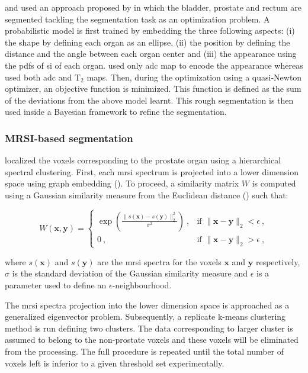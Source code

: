 \begin{enumerate}[leftmargin=*]
\cite{Litjens2011} and \cite{Vos2012} used an approach proposed by \cite{Huisman2010} in which the bladder, prostate and rectum are segmented tackling the segmentation task as an optimization problem. A probabilistic model is first trained by embedding the three following aspects: (i) the shape by defining each organ as an ellipse, (ii) the position by defining the distance and the angle between each organ center and (iii) the appearance using the \acp{pdf} of \ac{si} of each organ. \cite{Litjens2011} used only \ac{adc} map to encode the appearance whereas \cite{Vos2012} used both \ac{adc} and T$_2$ maps. Then, during the optimization using a quasi-Newton optimizer, an objective function is minimized. This function is defined as the sum of the deviations from the above model learnt. This rough segmentation is then used inside a Bayesian framework to refine the segmentation.

\end{enumerate}

\subsubsection{MRSI-based segmentation}

\cite{Tiwari2009} localized the voxels corresponding to the prostate organ using a hierarchical spectral clustering. First, each \ac{mrsi} spectrum is projected into a lower dimension space using graph embedding (\cite{Shi2000}). To proceed, a similarity matrix $W$ is computed using a Gaussian similarity measure from the Euclidean distance (\cite{Belkin2001}) such that:

\begin{equation}
	W(\mathbf{x},\mathbf{y}) =
	\begin{cases}	
	 	\exp \left( \frac{\| s(\mathbf{x}) - s(\mathbf{y}) \|_2^2}{\sigma^2} \right) \ , & \text{if } \| \mathbf{x} - \mathbf{y} \|_2 < \epsilon \ , \\
	 	0 \ , & \text{if } \| \mathbf{x} - \mathbf{y} \|_2 > \epsilon \ ,
	 \end{cases}
	\label{eq:ge1}
\end{equation}

\noindent where $s(\mathbf{x})$ and $s(\mathbf{y})$ are the \ac{mrsi} spectra for the voxels $\mathbf{x}$ and $\mathbf{y}$ respectively, $\sigma$ is the standard deviation of the Gaussian similarity measure and $\epsilon$ is a parameter used to define an $\epsilon$-neighbourhood.

The \ac{mrsi} spectra projection into the lower dimension space is approached as a generalized eigenvector problem. Subsequently, a replicate k-means clustering method is run defining two clusters. The data corresponding to larger cluster is assumed to belong to the non-prostate voxels and these voxels will be eliminated from the processing. The full procedure is repeated until the total number of voxels left is inferior to a given threshold set experimentally.